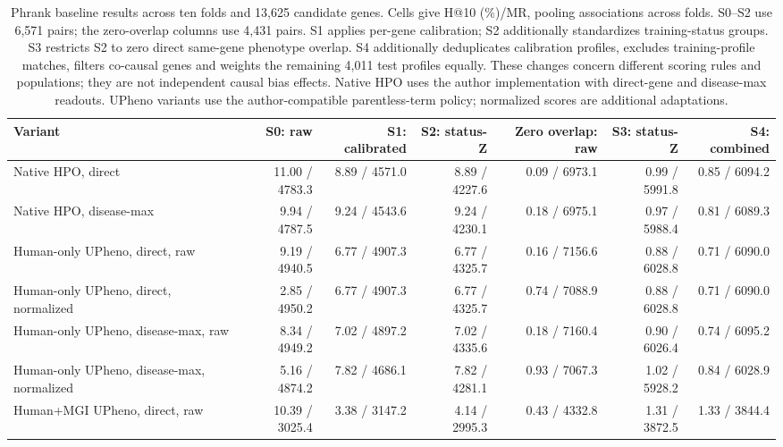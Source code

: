 \begin{landscape}
\begin{table}[p]
\centering\footnotesize
\setlength{\tabcolsep}{3pt}
\caption{Phrank baseline results across ten folds and 13,625 candidate genes. Cells give H@10 (\%)/MR, pooling associations across folds. S0--S2 use 6,571 pairs; the zero-overlap columns use 4,431 pairs. S1 applies per-gene calibration; S2 additionally standardizes training-status groups. S3 restricts S2 to zero direct same-gene phenotype overlap. S4 additionally deduplicates calibration profiles, excludes training-profile matches, filters co-causal genes and weights the remaining 4,011 test profiles equally. These changes concern different scoring rules and populations; they are not independent causal bias effects. Native HPO uses the author implementation with direct-gene and disease-max readouts. UPheno variants use the author-compatible parentless-term policy; normalized scores are additional adaptations.}
\label{tab:final_baseline_phrank}
\begin{adjustbox}{max width=\linewidth}
\begin{tabular}{lrrrrrr}
\toprule
Variant & S0: raw & S1: calibrated & S2: status-Z & Zero overlap: raw & S3: status-Z & S4: combined \\
\midrule
Native HPO, direct & 11.00 / 4783.3 & 8.89 / 4571.0 & 8.89 / 4227.6 & 0.09 / 6973.1 & 0.99 / 5991.8 & 0.85 / 6094.2 \\
Native HPO, disease-max & 9.94 / 4787.5 & 9.24 / 4543.6 & 9.24 / 4230.1 & 0.18 / 6975.1 & 0.97 / 5988.4 & 0.81 / 6089.3 \\
Human-only UPheno, direct, raw & 9.19 / 4940.5 & 6.77 / 4907.3 & 6.77 / 4325.7 & 0.16 / 7156.6 & 0.88 / 6028.8 & 0.71 / 6090.0 \\
Human-only UPheno, direct, normalized & 2.85 / 4950.2 & 6.77 / 4907.3 & 6.77 / 4325.7 & 0.74 / 7088.9 & 0.88 / 6028.8 & 0.71 / 6090.0 \\
Human-only UPheno, disease-max, raw & 8.34 / 4949.2 & 7.02 / 4897.2 & 7.02 / 4335.6 & 0.18 / 7160.4 & 0.90 / 6026.4 & 0.74 / 6095.2 \\
Human-only UPheno, disease-max, normalized & 5.16 / 4874.2 & 7.82 / 4686.1 & 7.82 / 4281.1 & 0.93 / 7067.3 & 1.02 / 5928.2 & 0.84 / 6028.9 \\
Human+MGI UPheno, direct, raw & 10.39 / 3025.4 & 3.38 / 3147.2 & 4.14 / 2995.3 & 0.43 / 4332.8 & 1.31 / 3872.5 & 1.33 / 3844.4 \\

\end{tabular}
\end{adjustbox}
\end{table}
\end{landscape}
